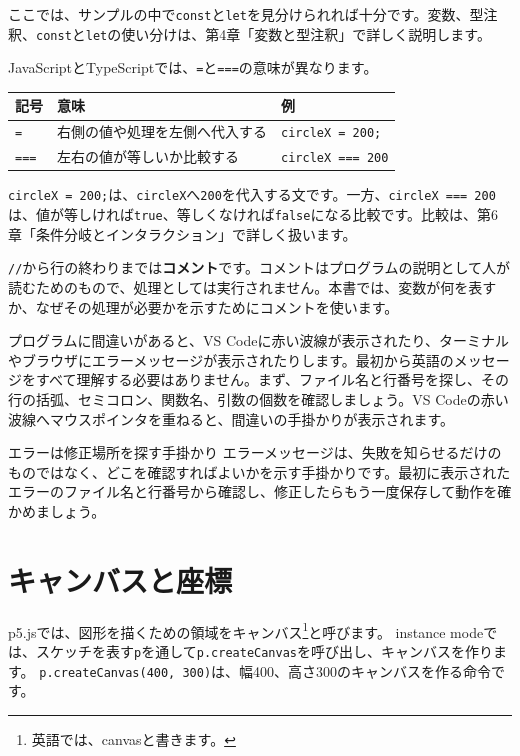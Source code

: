 ここでは、サンプルの中で\texttt{const}と\texttt{let}を見分けられれば十分です。変数、型注釈、\texttt{const}と\texttt{let}の使い分けは、第4章「変数と型注釈」で詳しく説明します。

JavaScriptとTypeScriptでは、\texttt{=}と\texttt{===}の意味が異なります。

\begin{center}
\begin{tabular}{lll}
    \toprule
    記号 & 意味 & 例 \\
    \midrule
    \texttt{=} & 右側の値や処理を左側へ代入する & \texttt{circleX = 200;} \\
    \texttt{===} & 左右の値が等しいか比較する & \texttt{circleX === 200} \\
    \bottomrule
\end{tabular}
\end{center}

\texttt{circleX = 200;}は、\texttt{circleX}へ\texttt{200}を代入する文です。一方、\texttt{circleX === 200}は、値が等しければ\texttt{true}、等しくなければ\texttt{false}になる比較です。比較は、第6章「条件分岐とインタラクション」で詳しく扱います。

\texttt{//}から行の終わりまでは\textbf{コメント}です。コメントはプログラムの説明として人が読むためのもので、処理としては実行されません。本書では、変数が何を表すか、なぜその処理が必要かを示すためにコメントを使います。

プログラムに間違いがあると、VS Codeに赤い波線が表示されたり、ターミナルやブラウザにエラーメッセージが表示されたりします。最初から英語のメッセージをすべて理解する必要はありません。まず、ファイル名と行番号を探し、その行の括弧、セミコロン、関数名、引数の個数を確認しましょう。VS Codeの赤い波線へマウスポインタを重ねると、間違いの手掛かりが表示されます。

\begin{pointbox}{エラーは修正場所を探す手掛かり}
エラーメッセージは、失敗を知らせるだけのものではなく、どこを確認すればよいかを示す手掛かりです。最初に表示されたエラーのファイル名と行番号から確認し、修正したらもう一度保存して動作を確かめましょう。
\end{pointbox}

\section{キャンバスと座標}

p5.jsでは、図形を描くための領域をキャンバス\footnote{英語では、canvasと書きます。}と呼びます。
instance modeでは、スケッチを表す\texttt{p}を通して\texttt{p.createCanvas}を呼び出し、キャンバスを作ります。
\texttt{p.createCanvas(400, 300)}は、幅400、高さ300のキャンバスを作る命令です。

